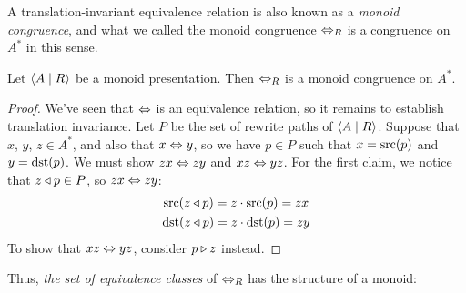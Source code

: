 \documentclass[../generics]{subfiles}
\begin{document}
A translation-invariant equivalence relation is also known as a \emph{monoid congruence}, and what we called the monoid congruence $\Leftrightarrow_R$ is a congruence on $A^*$ in this sense.

\begin{theorem}
Let $\langle A \mid R\rangle$ be a monoid presentation. Then $\Leftrightarrow_R$ is a monoid congruence on $A^*$.
\end{theorem}
\begin{proof}
We've seen that $\Leftrightarrow$ is an equivalence relation, so it remains to establish translation invariance. Let $P$ be the set of rewrite paths of $\langle A \mid R\rangle$. Suppose that $x$, $y$, $z\in A^*$, and also that $x\Leftrightarrow y$, so we have $p\in P$ such that $x=\operatorname{src}(p)$ and $y=\operatorname{dst}(p)$. We must show $zx\Leftrightarrow zy$ and $xz\Leftrightarrow yz$. For the first claim, we notice that $z\triangleleft p\in P$, so $zx\Leftrightarrow zy$:
\begin{gather*}
\operatorname{src}(z\triangleleft p)=z\cdot \operatorname{src}(p)=zx\\
\operatorname{dst}(z\triangleleft p)=z\cdot \operatorname{dst}(p)=zy
\end{gather*}
To show that $xz \Leftrightarrow yz$, consider $p\triangleright z$ instead.
\end{proof}

Thus, \emph{the set of equivalence classes} of $\Leftrightarrow_R$ has the structure of a monoid:
\end{document}
